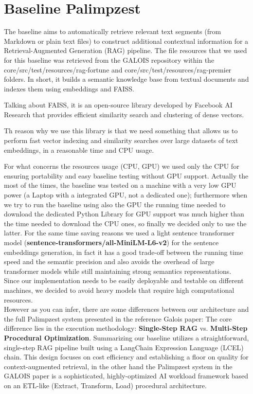 \section{Baseline Palimpzest}
The baseline aims to automatically retrieve relevant text segments (from Markdown or plain text files) to construct additional contextual information for a Retrieval-Augmented Generation (RAG) pipeline.
The file resources that we used for this baseline was retrieved from the GALOIS repository within the core/src/test/resources/rag-fortune and core/src/test/resources/rag-premier folders.
In short, it builds a semantic knowledge base from textual documents and indexes them using embeddings and FAISS.

Talking about FAISS, it is an open-source library developed by Facebook AI Research that provides efficient similarity search and clustering of dense vectors.

Th reason why we use this library is that we need something that allows us to perform fast vector indexing and similarity searches over large datasets of text embeddings, in a reasonable time and CPU usage.

For what concerns the resources usage (CPU, GPU) we used only the CPU for ensuring portability and easy baseline testing without GPU support.
Actually the most of the times, the baseline was tested on a machine with a very low GPU power (a Laptop with a integrated GPU, not a dedicated one); furthermore when we try to run the baseline using also the GPU the running time needed to download the dedicated Python Library for GPU support was much higher than the time needed to download the CPU ones, so finally we decided only to use the latter.
For the same time saving reasons we used a light sentence transformer model (\textbf{sentence-transformers/all-MiniLM-L6-v2}) for the sentence embeddings generation, in fact it has a good trade-off between the running time speed and the semantic precision and also avoids the overhead of large transformer models while still maintaining strong semantics representations.
\\Since our implementation needs to be easily deployable and testable on different machines, we decided to avoid heavy models that require high computational resources.
\\However as you can infer, there are some differences between our architecture and the full Palimpzest system presented in the reference Galois paper:
The core difference lies in the execution methodology: \textbf{Single-Step RAG} vs. \textbf{Multi-Step Procedural Optimization}.
Summarizing our baseline utilizes a straightforward, single-step RAG pipeline built using a LangChain Expression Language (LCEL) chain. This design focuses on cost efficiency and establishing a floor on quality for context-augmented retrieval,
in the other hand the Palimpzest system in the GALOIS paper is a sophisticated, highly-optimized AI workload framework based on an ETL-like (Extract, Transform, Load) procedural architecture.


